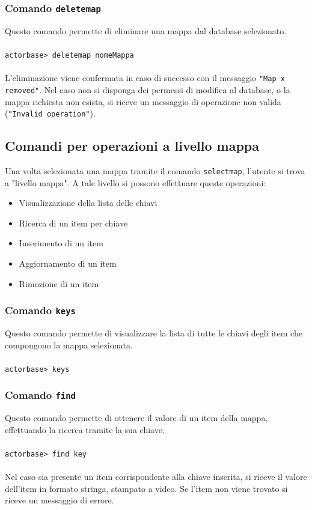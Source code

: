 \documentclass[a4paper]{article}
\begin{document}
	\subsubsection{Comando \texttt{deletemap}}
	Questo comando permette di eliminare una mappa dal database selezionato. 
	\\ \\
	\texttt{actorbase>	deletemap nomeMappa}
	\\ \\
	L'eliminazione viene confermata in caso di successo con il messaggio \texttt{"Map x removed"}. Nel caso non si disponga dei permessi di modifica al database, o la mappa richiesta non esista, si riceve un messaggio di operazione non valida (\texttt{"Invalid operation"}).
	

	\subsection{Comandi per operazioni a livello mappa}
	Una volta selezionata una mappa tramite il comando \texttt{selectmap}, l'utente si trova a "livello mappa". A tale livello si possono effettuare queste operazioni:
	\begin{itemize}
		\item Visualizzazione della lista delle chiavi
		\item Ricerca di un item per chiave
		\item Inserimento di un item 
		\item Aggiornamento di un item
		\item Rimozione di un item
	\end{itemize}

	\subsubsection{Comando \texttt{keys}}
	Questo comando permette di visualizzare la lista di tutte le chiavi degli item che compongono la mappa selezionata.
	\\ \\
	\texttt{actorbase>	keys}

	\subsubsection{Comando \texttt{find}}
	Questo comando permette di ottenere il valore di un item della mappa, effettuando la ricerca tramite la sua chiave.
	\\ \\
	\texttt{actorbase>	find key}
	\\ \\
	Nel caso sia presente un item corrispondente alla chiave inserita, si riceve il valore dell'item in formato stringa, stampato a video. Se l'item non viene trovato si riceve un messaggio di errore.
\end{document}

